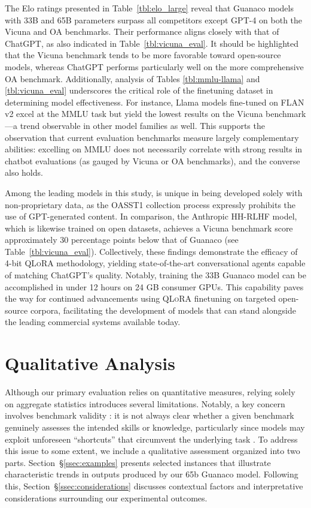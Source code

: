 The Elo ratings presented in Table~\ref{tbl:elo_large} reveal that {Guanaco} models with 33B and 65B parameters surpass all competitors except GPT-4 on both the Vicuna and OA benchmarks. Their performance aligns closely with that of ChatGPT, as also indicated in Table~\ref{tbl:vicuna_eval}. It should be highlighted that the Vicuna benchmark tends to be more favorable toward open-source models, whereas ChatGPT performs particularly well on the more comprehensive OA benchmark. Additionally, analysis of Tables \ref{tbl:mmlu-llama} and \ref{tbl:vicuna_eval} underscores the critical role of the finetuning dataset in determining model effectiveness. For instance, Llama models fine-tuned on FLAN v2 excel at the MMLU task but yield the lowest results on the Vicuna benchmark—a trend observable in other model families as well. This supports the observation that current evaluation benchmarks measure largely complementary abilities: excelling on MMLU does not necessarily correlate with strong results in chatbot evaluations (as gauged by Vicuna or OA benchmarks), and the converse also holds.

Among the leading models in this study, is unique in being developed solely with non-proprietary data, as the OASST1 collection process expressly prohibits the use of GPT-generated content. In comparison, the Anthropic HH-RLHF model, which is likewise trained on open datasets, achieves a Vicuna benchmark score approximately 30 percentage points below that of {Guanaco} (see Table~\ref{tbl:vicuna_eval}). Collectively, these findings demonstrate the efficacy of 4-bit \textsc{QLoRA} methodology, yielding state-of-the-art conversational agents capable of matching ChatGPT's quality. Notably, training the 33B {Guanaco} model can be accomplished in under 12 hours on 24 GB consumer GPUs. This capability paves the way for continued advancements using \textsc{QLoRA} finetuning on targeted open-source corpora, facilitating the development of models that can stand alongside the leading commercial systems available today.

\section{Qualitative Analysis}

Although our primary evaluation relies on quantitative measures, relying solely on aggregate statistics introduces several limitations. Notably, a key concern involves benchmark validity \citep{liao2021we}: it is not always clear whether a given benchmark genuinely assesses the intended skills or knowledge, particularly since models may exploit unforeseen ``shortcuts'' that circumvent the underlying task \citep{gururangan2018annotation, poliak2018hypothesis}. To address this issue to some extent, we include a qualitative assessment organized into two parts. Section~\S\ref{ssec:examples} presents selected instances that illustrate characteristic trends in outputs produced by our 65b {Guanaco} model. Following this, Section~\S\ref{ssec:considerations} discusses contextual factors and interpretative considerations surrounding our experimental outcomes.

